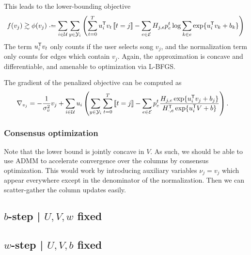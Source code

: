 \documentclass{article}
\def\E{\ensuremath{\mathcal{E}}}
\def\U{\ensuremath{\mathcal{U}}}
\begin{document}
This leads to the lower-bounding objective 
\begin{equation}
f(v_j) \gtrsim \phi(v_j) \defeq \sum_{i \in \U} \sum_{y \in \Y_i} \left(\sum_{t=0}^T u_i\trans v_t \ind{t = j} - \sum_{e \in \E} H_{j,e} p_e^t \log \sum_{k\in e} \exp\{u_i\trans v_k + b_k\} \right)
\end{equation}
The term $u_i^\mathsf{T} v_t$ only counts if the user selects song $v_j$, and the normalization term only counts for edges which contain $v_j$.  Again, the approximation is concave and
differentiable, and amenable to optimization via L-BFGS.

The gradient of the penalized objective can be computed as 
\begin{align}
\nabla_{v_j} &= -\frac{1}{\sigma_v^2} v_j + \sum_{i \in \U}u_i \left(\sum_{y \in \Y_i} \sum_{t=0}^T \ind{t=j} - \sum_{e \in \E} p_e^t \frac{H_{j,e} \exp\{u_i\trans v_j +
b_j\}}{H_{\cdot,e}\trans \exp\{u_i\trans V + b\}}\right).
\end{align}

\subsubsection{Consensus optimization}
Note that the lower bound is jointly concave in $V$. As such, we should be able to use ADMM to accelerate convergence over the columns by consensus optimization.  This would work by
introducing auxiliary variables $\nu_j = v_j$ which appear everywhere except in the denominator of the normalization.  Then we can scatter-gather the column updates easily.


\subsection{$b$-step | $U, V, w$ fixed}

\subsection{$w$-step | $U, V, b$ fixed}
\end{document}
